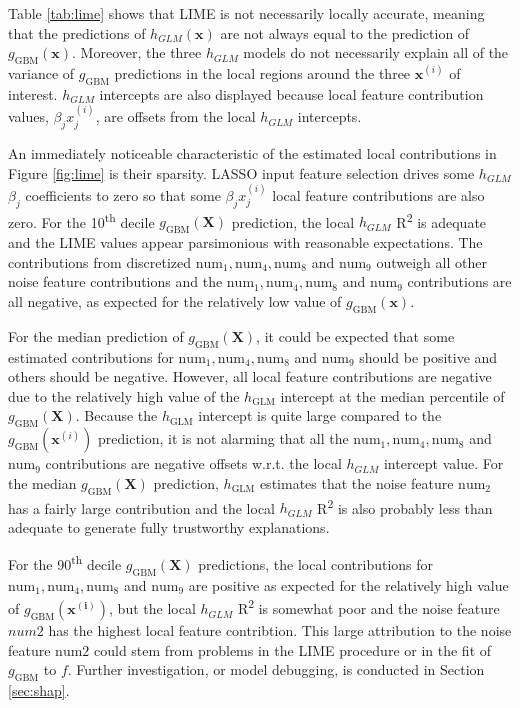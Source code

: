 \documentclass[11pt]{asaproc}
\begin{document}
Table \ref{tab:lime} shows that LIME is not necessarily locally accurate, meaning that the predictions of $h_{GLM}(\mathbf{x})$ are not always equal to the prediction of $g_{\text{GBM}}(\mathbf{x})$. Moreover, the three $h_{GLM}$ models do not necessarily explain all of the variance of $g_{\text{GBM}}$ predictions in the local regions around the three $\mathbf{x}^{(i)}$ of interest. $h_{GLM}$ intercepts are also displayed because local feature contribution values, $\beta_j x_j^{(i)}$, are offsets from the local $h_{GLM}$ intercepts.

An immediately noticeable characteristic of the estimated local contributions in Figure \ref{fig:lime} is their sparsity. LASSO input feature selection drives some $h_{GLM}$ $\beta_j$ coefficients to zero so that some $\beta_j x_j^{(i)}$ local feature contributions are also zero. For the 10\textsuperscript{th} decile $g_{\text{GBM}}(\mathbf{X})$ prediction, the local $h_{GLM}$ R\textsuperscript{2} is adequate and the LIME values appear parsimonious with reasonable expectations. The contributions from discretized $\text{num}_1, \text{num}_4, \text{num}_8$ and $\text{num}_9$ outweigh all other noise feature contributions and the $\text{num}_1, \text{num}_4, \text{num}_8$ and $\text{num}_9$ contributions are all negative, as expected for the relatively low value of $g_{\text{GBM}}(\mathbf{x})$. 

For the median prediction of $g_{\text{GBM}}(\mathbf{X})$, it could be expected that some estimated contributions for $\text{num}_1, \text{num}_4, \text{num}_8$ and $\text{num}_9$ should be positive and others should be negative. However, all local feature contributions are negative due to the relatively high value of the $h_{\text{GLM}}$ intercept at the median percentile of $g_{\text{GBM}}(\mathbf{X})$. Because the $h_{\text{GLM}}$ intercept is quite large compared to the $g_{\text{GBM}}(\mathbf{x}^{(i)})$ prediction, it is not alarming that all the $\text{num}_1, \text{num}_4, \text{num}_8$ and $\text{num}_9$ contributions are negative offsets w.r.t. the local $h_{GLM}$ intercept value. For the median $g_{\text{GBM}}(\mathbf{X})$ prediction, $h_{\text{GLM}}$ estimates that the noise feature $\text{num}_2$ has a fairly large contribution and the local $h_{GLM}$ R\textsuperscript{2} is also probably less than adequate to generate fully trustworthy explanations.

For the 90\textsuperscript{th} decile $g_{\text{GBM}}(\mathbf{X})$ predictions, the local contributions for $\text{num}_1, \text{num}_4, \text{num}_8$ and $\text{num}_9$ are positive as expected for the relatively high value of $g_{\text{GBM}}(\mathbf{x^{(i)}})$, but the local $h_{GLM}$ R\textsuperscript{2} is somewhat poor and the noise feature $num2$ has the highest local feature contribtion. This large attribution to the noise feature $\text{num}2$ could stem from problems in the LIME procedure or in the fit of $g_{\text{GBM}}$ to $f$. Further investigation, or model debugging, is conducted in Section \ref{sec:shap}.
\end{document}
